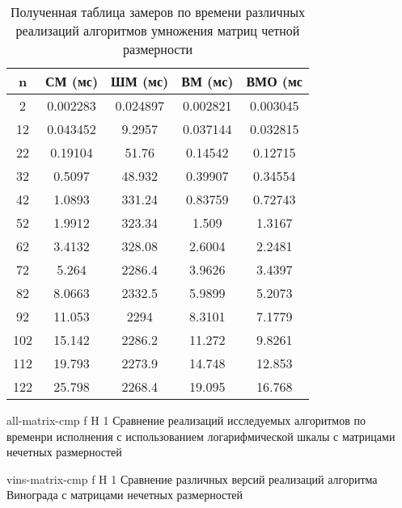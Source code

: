 \begin{table}[!ht]
	\centering
	\caption{Полученная таблица замеров по времени различных реализаций алгоритмов умножения матриц четной размерности}
	\begin{tabular}{|c|c|c|c|c|}
		\hline
		n   & СМ (мс)  & ШМ (мс)  & ВМ (мс)  & ВМО (мс  \\ \hline
		2   & 0.002283 & 0.024897 & 0.002821 & 0.003045 \\ \hline
		12  & 0.043452 & 9.2957   & 0.037144 & 0.032815 \\ \hline
		22  & 0.19104  & 51.76    & 0.14542  & 0.12715  \\ \hline
		32  & 0.5097   & 48.932   & 0.39907  & 0.34554  \\ \hline
		42  & 1.0893   & 331.24   & 0.83759  & 0.72743  \\ \hline
		52  & 1.9912   & 323.34   & 1.509    & 1.3167   \\ \hline
		62  & 3.4132   & 328.08   & 2.6004   & 2.2481   \\ \hline
		72  & 5.264    & 2286.4   & 3.9626   & 3.4397   \\ \hline
		82  & 8.0663   & 2332.5   & 5.9899   & 5.2073   \\ \hline
		92  & 11.053   & 2294     & 8.3101   & 7.1779   \\ \hline
		102 & 15.142   & 2286.2   & 11.272   & 9.8261   \\ \hline
		112 & 19.793   & 2273.9   & 14.748   & 12.853   \\ \hline
		122 & 25.798   & 2268.4   & 19.095   & 16.768   \\ \hline
	\end{tabular}
	\label{t:timings_even}
\end{table}



{all-matrix-cmp} %
{f} %
{H} %
{1\textwidth} %
{Сравнение реализаций исследуемых алгоритмов по временри исполнения с использованием логарифмической шкалы с матрицами нечетных размерностей} %

{vins-matrix-cmp} %
{f} %
{H} %
{1\textwidth} %
{Сравнение различных версий реализаций алгоритма Винограда с матрицами нечетных размерностей} %

